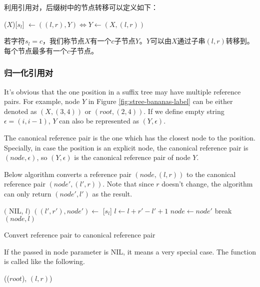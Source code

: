 \documentclass[UTF8]{article}
\begin{document}
利用引用对，后缀树中的节点转移可以定义如下：

($X$)[$s_l$] $\gets ((l, r), Y) \iff Y \gets (X, (l, r))$

若字符$s_l=c$，我们称节点$X$有一个$c$子节点$Y$。$Y$可以由$X$通过子串$(l, r)$转移到。每个节点最多有一个$c$子节点。

\subsubsection{归一化引用对}

It's obvious that the one position in a suffix tree may have multiple reference pairs.
For example, node $Y$ in Figure \ref{fig:stree-bananas-label} can be either
denoted as $(X, (3, 4))$ or $(root, (2, 4))$. If we define empty string
$\epsilon=(i, i-1)$, $Y$ can also be represented as $(Y, \epsilon)$.

The canonical reference pair is the one which has the closest node
to the position. Specially, in case the position is an
explicit node, the canonical reference pair is $(node, \epsilon)$, so $(Y, \epsilon)$
is the canonical reference pair of node $Y$.

Below algorithm converts a reference pair $(node, (l, r))$
to the canonical reference pair $(node', (l', r))$.
Note that since $r$ doesn't change, the algorithm can only return
$(node', l')$ as the result.

\begin{algorithm}
\begin{algorithmic}[1]
      \State \Return $($ NIL, $l)$
    \Else
      \State \Return {}
    \EndIf
  \EndIf
   
    \State $((l', r'), node') \gets$ [$s_l$]
      \State $l \gets l + r' - l' + 1$ 
      \State $node \gets node'$
    \Else
      \State break
    \EndIf
  \EndWhile
  \State \Return $(node, l)$
\EndFunction
\end{algorithmic}
\caption{Convert reference pair to canonical reference pair}
\label{algo:canon}
\end{algorithm}

If the passed in node parameter is NIL, it means a very special case.
The function is called like the following.

(($root$), $(l, r)$)
\end{document}
